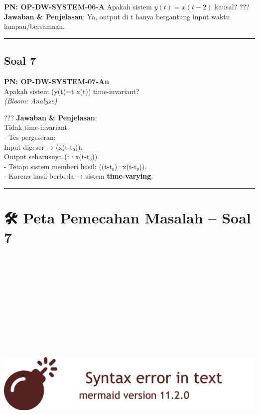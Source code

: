 \documentclass[
  letterpaper,
  DIV=11,
  numbers=noendperiod]{scrreprt}
\begin{document}
\textbf{PN: OP-DW-SYSTEM-06-A} Apakah sistem \(y(t)=x(t-2)\) kausal? ???
\textbf{Jawaban \& Penjelasan}: Ya, output di t hanya bergantung input
waktu lampau/bersamaan.

\begin{center}\rule{0.5\linewidth}{0.5pt}\end{center}

\subsection{Soal 7}\label{soal-7}

\textbf{PN: OP-DW-SYSTEM-07-An}\\
Apakah sistem (y(t)=t \cdot x(t)) time-invariant?\\
\emph{(Bloom: Analyze)}

??? \textbf{Jawaban \& Penjelasan}:\\
Tidak time-invariant.\\
- Tes pergeseran:\\
Input digeser → (x(t-t₀)).\\
Output seharusnya (t·x(t-t₀)).\\
- Tetapi sistem memberi hasil: ((t-t₀)·x(t-t₀)).\\
- Karena hasil berbeda → sistem \textbf{time-varying}.

\begin{center}\rule{0.5\linewidth}{0.5pt}\end{center}

\section{🛠️ Peta Pemecahan Masalah -- Soal
7}\label{peta-pemecahan-masalah-soal-7}

\includegraphics[width=25.13in,height=5.33in]{kuliah/Peta_1_files/figure-latex/mermaid-figure-2.png}
\end{document}
